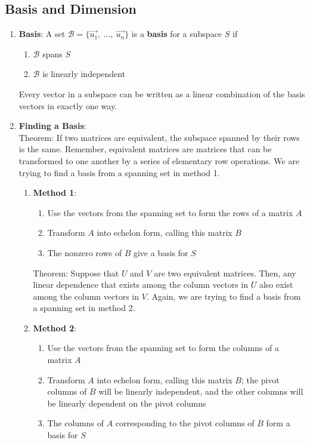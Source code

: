 \documentclass[10pt]{article}
\begin{document}
\subsection{Basis and Dimension}
\begin{enumerate}
\item \textbf{Basis}: A set $\mathcal{B} = \lbrace \vec{u_1},\ ...,\ \vec{u_n} \rbrace$ is a \textbf{basis} for a subspace $S$ if 
\begin{enumerate}
\item $\mathcal{B}$ spans $S$
\item $\mathcal{B}$ is linearly independent
\end{enumerate}
Every vector in a subspace can be written as a linear combination of the basis vectors in exactly one way.
\item \textbf{Finding a Basis}: \\
Theorem: If two matrices are equivalent, the subspace spanned by their rows is the same. Remember, equivalent matrices are matrices that can be transformed to one another by a series of elementary row operations. We are trying to find a basis from a spanning set in method 1.
\begin{enumerate}
\item \textbf{Method 1}:
\begin{enumerate}
\item Use the vectors from the spanning set to form the rows of a matrix $A$
\item Transform $A$ into echelon form, calling this matrix $B$
\item The nonzero rows of $B$ give a basis for $S$
\end{enumerate}
Theorem: Suppose that $U$ and $V$ are two equivalent matrices. Then, any linear dependence that exists among the column vectors in $U$ also exist among the column vectors in $V$. Again, we are trying to find a basis from a spanning set in method 2.
\item \textbf{Method 2}:
\begin{enumerate}
\item Use the vectors from the spanning set to form the columns of a matrix $A$
\item Transform $A$ into echelon form, calling this matrix $B$; the pivot columns of $B$ will be linearly independent, and the other columns will be linearly dependent on the pivot columns
\item The columns of $A$ corresponding to the pivot columns of $B$ form a basis for $S$
\end{enumerate}

\end{enumerate}
\end{enumerate}
\end{document}
